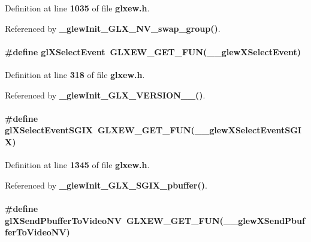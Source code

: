 Definition at line {\bf 1035} of file {\bf glxew.\+h}.



Referenced by {\bf \+\_\+glew\+Init\+\_\+\+G\+L\+X\+\_\+\+N\+V\+\_\+swap\+\_\+group()}.

\paragraph[{gl\+X\+Select\+Event}]{\setlength{\rightskip}{0pt plus 5cm}\#define gl\+X\+Select\+Event~{\bf G\+L\+X\+E\+W\+\_\+\+G\+E\+T\+\_\+\+F\+UN}({\bf \+\_\+\+\_\+glew\+X\+Select\+Event})}\label{glxew_8h_ae48a8b59c2f59eca403f596fc436d2e8}


Definition at line {\bf 318} of file {\bf glxew.\+h}.



Referenced by {\bf \+\_\+glew\+Init\+\_\+\+G\+L\+X\+\_\+\+V\+E\+R\+S\+I\+O\+N\+\_\+\_()}.

\paragraph[{gl\+X\+Select\+Event\+S\+G\+IX}]{\setlength{\rightskip}{0pt plus 5cm}\#define gl\+X\+Select\+Event\+S\+G\+IX~{\bf G\+L\+X\+E\+W\+\_\+\+G\+E\+T\+\_\+\+F\+UN}({\bf \+\_\+\+\_\+glew\+X\+Select\+Event\+S\+G\+IX})}\label{glxew_8h_a71e6d09bc0b52b096554910029c93b3a}


Definition at line {\bf 1345} of file {\bf glxew.\+h}.



Referenced by {\bf \+\_\+glew\+Init\+\_\+\+G\+L\+X\+\_\+\+S\+G\+I\+X\+\_\+pbuffer()}.

\paragraph[{gl\+X\+Send\+Pbuffer\+To\+Video\+NV}]{\setlength{\rightskip}{0pt plus 5cm}\#define gl\+X\+Send\+Pbuffer\+To\+Video\+NV~{\bf G\+L\+X\+E\+W\+\_\+\+G\+E\+T\+\_\+\+F\+UN}({\bf \+\_\+\+\_\+glew\+X\+Send\+Pbuffer\+To\+Video\+NV})}\label{glxew_8h_a2c7dc0c9fd72ae581613ad8eadbda722}


